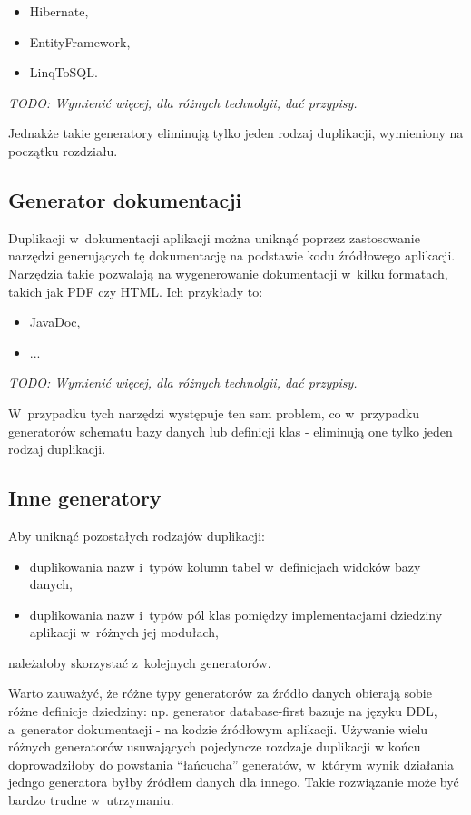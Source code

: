 \begin{itemize}
 \item Hibernate,
 \item EntityFramework,
 \item LinqToSQL.
\end{itemize}

\emph{TODO: Wymienić więcej, dla różnych technolgii, dać przypisy.}

Jednakże takie generatory eliminują tylko jeden rodzaj duplikacji, wymieniony na początku rozdziału.


\subsection{Generator dokumentacji}

Duplikacji w~dokumentacji aplikacji można uniknąć poprzez zastosowanie narzędzi generujących tę dokumentację na podstawie kodu źródłowego aplikacji.
Narzędzia takie pozwalają na wygenerowanie dokumentacji w~kilku formatach, takich jak PDF czy HTML.
Ich przykłady to:

\begin{itemize}
 \item JavaDoc,
 \item ...
\end{itemize}

\emph{TODO: Wymienić więcej, dla różnych technolgii, dać przypisy.}

W~przypadku tych narzędzi występuje ten sam problem, co w~przypadku generatorów schematu bazy danych lub definicji klas - eliminują one tylko jeden rodzaj duplikacji.


\subsection{Inne generatory}

Aby uniknąć pozostałych rodzajów duplikacji:

\begin{itemize}
 \item duplikowania nazw i~typów kolumn tabel w~definicjach widoków bazy danych,
 \item duplikowania nazw i~typów pól klas pomiędzy implementacjami dziedziny aplikacji w~różnych jej modułach,
\end{itemize}

należałoby skorzystać z~kolejnych generatorów.

Warto zauważyć, że różne typy generatorów za źródło danych obierają sobie różne definicje dziedziny: np. generator database-first bazuje na języku DDL, a~generator dokumentacji - na kodzie źródłowym aplikacji.
Używanie wielu różnych generatorów usuwających pojedyncze rozdzaje duplikacji w końcu doprowadziłoby do powstania ``łańcucha'' generatów, w~którym wynik działania jedngo generatora byłby źródłem danych dla innego.
Takie rozwiązanie może być bardzo trudne w~utrzymaniu.



